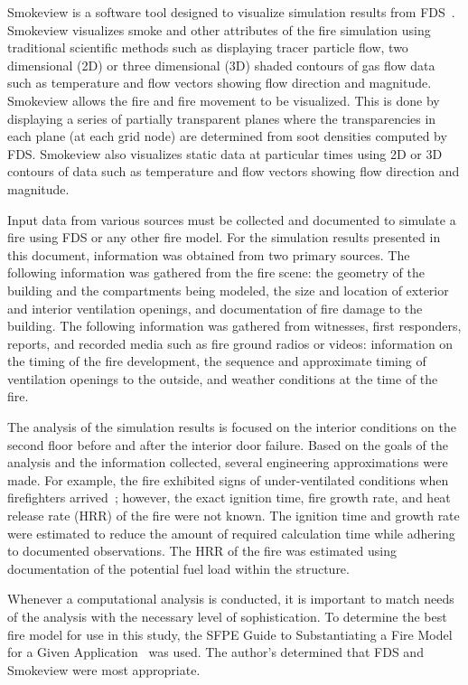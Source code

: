 Smokeview is a software tool designed to visualize simulation results from FDS~\cite{Smokeview_Users_Guide}. Smokeview visualizes smoke and other attributes of the fire simulation using traditional scientific methods such as displaying tracer particle flow, two dimensional (2D) or three dimensional (3D) shaded contours of gas flow data such as temperature and flow vectors showing flow direction and magnitude. Smokeview allows the fire and fire movement to be visualized. This is done by displaying a series of partially transparent planes where the transparencies in each plane (at each grid node) are determined from soot densities computed by FDS. Smokeview also visualizes static data at particular times using 2D or 3D contours of data such as temperature and flow vectors showing flow direction and magnitude.

Input data from various sources must be collected and documented to simulate a fire using FDS or any other fire model. For the simulation results presented in this document, information was obtained from two primary sources. The following information was gathered from the fire scene: the geometry of the building and the compartments being modeled, the size and location of exterior and interior ventilation openings, and documentation of fire damage to the building. The following information was gathered from witnesses, first responders, reports, and recorded media such as fire ground radios or videos: information on the timing of the fire development, the sequence and approximate timing of ventilation openings to the outside, and weather conditions at the time of the fire. 

The analysis of the simulation results is focused on the interior conditions on the second floor before and after the interior door failure. Based on the goals of the analysis and the information collected, several engineering approximations were made. For example, the fire exhibited signs of under-ventilated conditions when firefighters arrived~\cite{NIOSH:Bowyer}; however, the exact ignition time, fire growth rate, and heat release rate (HRR) of the fire were not known. The ignition time and growth rate were estimated to reduce the amount of required calculation time while adhering to documented observations. The HRR of the fire was estimated using documentation of the potential fuel load within the structure.

Whenever a computational analysis is conducted, it is important to match needs of the analysis with the necessary level of sophistication. To determine the best fire model for use in this study, the SFPE Guide to Substantiating a Fire Model for a Given Application~\cite{SFPE_G.06} was used. The author's determined that FDS and Smokeview were most appropriate.
 
